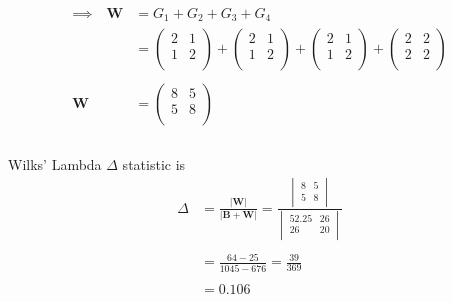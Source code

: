 \documentclass[11pt,a4paper]{article}
\theoremstyle{definition}
\begin{document}
\begin{align*}
\implies \quad  \textbf{W} & = G_1 + G_2 + G_3 + G_4\\
& = \begin{pmatrix}
2 & 1\\
1 & 2\\
\end{pmatrix}
+ \begin{pmatrix}
2 & 1\\
1 & 2\\
\end{pmatrix} + \begin{pmatrix}
2 & 1\\
1 & 2\\
\end{pmatrix} +\begin{pmatrix}
2 & 2\\
2 & 2\\
\end{pmatrix}\\\\
\textbf{W} & = \begin{pmatrix}
8 & 5\\
5 & 8\\
\end{pmatrix}\\\\
\end{align*}











Wilks' Lambda $\Delta$ statistic is 
\begin{align*}
\Delta & = \frac{\Big|\textbf{W}\Big|}{\Big|\textbf{B}+\textbf{W}\Big|}
 = \frac{
\begin{vmatrix}
8 & 5\\
5 & 8\\
\end{vmatrix}
}{
\begin{vmatrix}
52.25 & 26\\
26 & 20\\
\end{vmatrix}
}\\\\
& = \frac{64-25}{1045-676}=\frac{39}{369}\\\\
& = 0.106\\
\end{align*}
\end{document}
